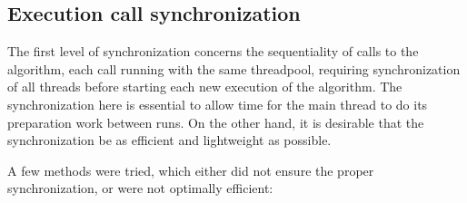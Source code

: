 \subsection{Execution call synchronization}

The first level of synchronization concerns the sequentiality of calls to the algorithm, each call running with the same threadpool, requiring synchronization of all threads before starting each new execution of the algorithm. The synchronization here is essential to allow time for the main thread to do its preparation work between runs. On the other hand, it is desirable that the synchronization be as efficient and lightweight as possible.

A few methods were tried, which either did not ensure the proper synchronization, or were not optimally efficient:

